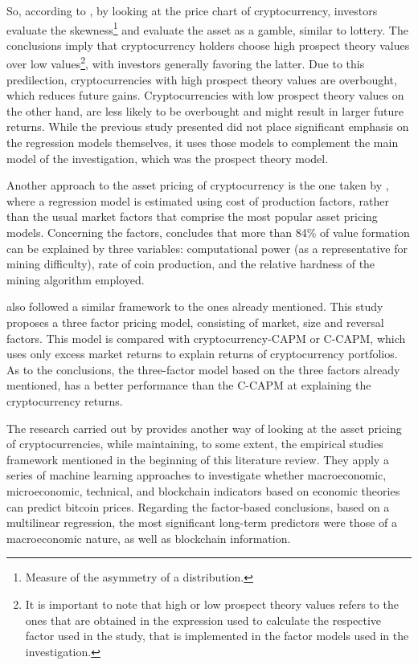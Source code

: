 So, according to \parencite{thoma2020prospect}, by looking at the price chart of cryptocurrency, investors evaluate the skewness\footnote{Measure of the asymmetry of a distribution.} and evaluate the asset as a gamble, similar to lottery. The conclusions imply that cryptocurrency holders choose high prospect theory values over low values\footnote{It is important to note that high or low prospect theory values refers to the ones that are obtained in the expression used to calculate the respective factor used in the study, that is implemented in the factor models used in the investigation.}, with investors generally favoring the latter. Due to this predilection, cryptocurrencies with high prospect theory values are overbought, which reduces future gains. Cryptocurrencies with low prospect theory values on the other hand, are less likely to be overbought and might result in larger future returns. While the previous study presented did not place significant emphasis on the regression models themselves, it uses those models to complement the main model of the investigation, which was the prospect theory model.

Another approach to the asset pricing of cryptocurrency is the one taken by \parencite{HAYES20171308}, where a regression model is estimated using cost of production factors, rather than the usual market factors that comprise the most popular asset pricing models. Concerning the factors, \parencite{HAYES20171308} concludes that more than 84\% of value formation can be explained by three variables: computational power (as a representative for mining difficulty), rate of coin production, and the relative hardness of the mining algorithm employed.

\parencite{Shen2020} also followed a similar framework to the ones already mentioned. This study proposes a three factor pricing model, consisting of market, size and reversal factors. This model is compared with cryptocurrency-CAPM or C-CAPM, which uses only excess market returns to explain returns of cryptocurrency portfolios. As to the conclusions, the three-factor model based on the three factors already mentioned, has a better performance than the C-CAPM at explaining the cryptocurrency returns.

The research carried out by \parencite{Erfanian2022} provides another way of looking at the asset pricing of cryptocurrencies, while maintaining, to some extent, the empirical studies framework mentioned in the beginning of this literature review. They apply a series of machine learning approaches to investigate whether macroeconomic, microeconomic, technical, and blockchain indicators based on economic theories can predict bitcoin prices. Regarding the factor-based conclusions, based on a multilinear regression, the most significant long-term predictors were those of a macroeconomic nature, as well as blockchain information. 


